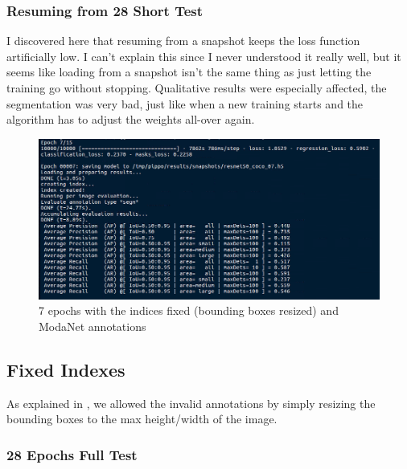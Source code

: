 \subsubsection{Resuming from 28 Short Test}

I discovered here that resuming from a snapshot keeps the loss function artificially low. I can't explain this since I never understood it really well, but it seems like loading from a snapshot isn't the same thing as just letting the training go without stopping. Qualitative results were especially affected, the segmentation was very bad, just like when a new training starts and the algorithm has to adjust the weights all-over again.

\begin{figure}[H]
	\centering
	\includegraphics[width=\linewidth]{figures/train/28-50resuming7}
	\caption{7 epochs with the indices fixed (bounding boxes resized) and ModaNet annotations}
	\label{f:train-28-50resuming7}
\end{figure}

\subsection{Fixed Indexes}

As explained in , we allowed the invalid annotations by simply resizing the bounding boxes to the max height/width of the image.

\subsubsection{28 Epochs Full Test}\label{s:train-28fixedindices}

